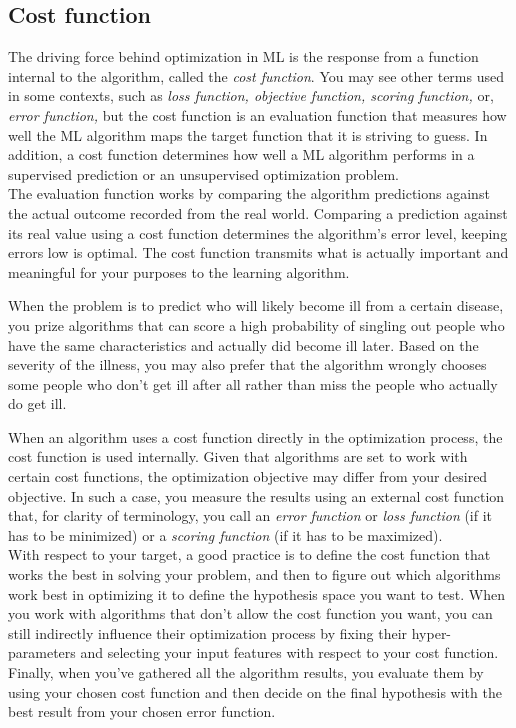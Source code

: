 \subsection{Cost function}
The driving force behind optimization in ML is the response from a function internal to the algorithm, called the \emph{cost function}. You may see other terms used in some contexts, such as \emph{loss function, objective function, scoring function,} or, \emph{error function,} but the cost function is an evaluation function that measures how well the ML algorithm maps the target function that it is striving to guess. In addition, a cost function determines how well a ML algorithm performs in a supervised prediction or an unsupervised optimization problem.\\
The evaluation function works by comparing the algorithm predictions against the actual outcome recorded from the real world. Comparing a prediction against its real value using a cost function determines the algorithm's error level, keeping errors low is optimal. The cost function transmits what is actually important and meaningful for your purposes to the learning algorithm.
\begin{example}
	When the problem is to predict who will likely become ill from a certain disease, you prize algorithms that can score a high probability of singling out people who have the same characteristics and actually did become ill later. Based on the severity of the illness, you may also prefer that the algorithm wrongly chooses some people who don't get ill after all rather than miss the people who actually do get ill.
\end{example}
When an algorithm uses a cost function directly in the optimization process, the cost function is used internally. Given that algorithms are set to work with certain cost functions, the optimization objective may differ from your desired objective. In such a case, you measure the results using an external cost function that, for clarity of terminology, you call an \emph{error function} or \emph{loss function} (if it has to be minimized) or a \emph{scoring function} (if it has to be maximized).
\\
With respect to your target, a good practice is to define the cost function that works the best in solving your problem, and then to figure out which algorithms work best in optimizing it to define the hypothesis space you want to test. When you work with algorithms that don't allow the cost function you want, you can still indirectly influence their optimization process by fixing their hyper-parameters and selecting your input features with respect to your cost function. Finally, when you've gathered all the algorithm results, you evaluate them by using your chosen cost function and then decide on the final hypothesis with the best result from your chosen error function.
